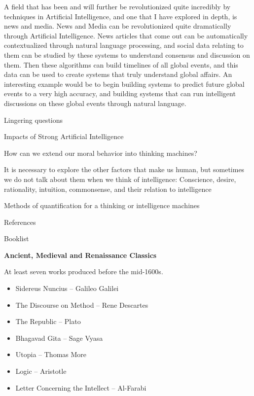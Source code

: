 \documentclass[11pt]{article}
\begin{document}
\par A field that has been and will further be revolutionized quite incredibly by techniques in Artificial Intelligence, and one that I have explored in depth, is news and media. News and Media can be revolutionized quite dramatically through Artificial Intelligence. News articles that come out can be automatically contextualized through natural language processing, and social data relating to them can be studied by these systems to understand consensus and discussion on them. Then these algorithms can build timelines of all global events, and this data can be used to create systems that truly understand global affairs. An interesting example would be to begin building systems to predict future global events to a very high accuracy, and building systems that can run intelligent discussions on these global events through natural language.

\begin{center}
	{\large Lingering questions\par}
\end{center}

\par Impacts of Strong Artificial Intelligence
\par How can we extend our moral behavior into thinking machines?
\par It is necessary to explore the other factors that make us human, but sometimes we do not talk about them when we think of intelligence: Conscience, desire, rationality, intuition, commonsense, and their relation to intelligence
\par Methods of quantification for a thinking or intelligence machines

\begin{center}
	{\large References\par}
\end{center}

\newpage

{\Large Booklist\\\par}

\par \textbf{Ancient, Medieval and Renaissance Classics}
\par At least seven works produced before the mid-1600s.
\begin{itemize}
	\item Sidereus Nuncius ­-- Galileo Galilei
	\item The Discourse on Method -- Rene Descartes
	\item The Republic -- Plato
	\item Bhagavad Gita -- Sage Vyasa
	\item Utopia -- Thomas More
	\item Logic -- Aristotle
	\item Letter Concerning the Intellect -- Al-Farabi
\end{itemize}
\end{document}
